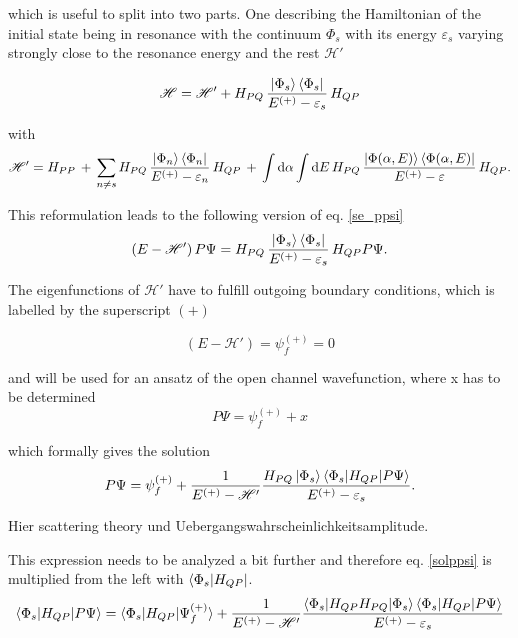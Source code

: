 which is useful to split into two parts. One describing the Hamiltonian of the
initial state being in resonance with the continuum $\Phi_s$ with its energy
$\varepsilon_s$ varying strongly close to the resonance energy and the rest
$\mathscr{H}'$

\begin{equation}
  \mathscr{H} = \mathscr{H}' + H_{PQ} \,\frac{\ket{\Phi_s}\bra{\Phi_s}}{E^{(+)}-\varepsilon_s}\, H_{QP}
\end{equation}

with
\begin{equation}
  \mathscr{H}' = H_{PP}\, + \,
  \sum\limits_{n\ne s} H_{PQ} \,\frac{\ket{\Phi_n}\bra{\Phi_n}}{E^{(+)}-\varepsilon_n}
  \, H_{QP} \,+\,
  \int \mathrm{d}\alpha \int\mathrm{d}E \,H_{PQ} \,
  \frac{\ket{\Phi(\alpha,E)}\bra{\Phi(\alpha,E)}}{E^{(+)}-\varepsilon} \, H_{QP} .
\end{equation}

This reformulation leads to the following version of eq. \ref{se_ppsi}
\begin{equation}
  (E - \mathscr{H}')\, P \Psi =
   H_{PQ} \,\frac{\ket{\Phi_s}\bra{\Phi_s}}{E^{(+)}-\varepsilon_s}\, H_{QP} P \Psi .
\end{equation}

The eigenfunctions of $\mathscr{H}'$ have to fulfill outgoing boundary conditions,
which is labelled by the superscript $(+)$

\begin{equation}
  (E-\mathscr{H}') = \psi_f^{(+)} = 0 \label{sol_outg}
\end{equation}

and will be used for an ansatz of the open channel wavefunction, where x has to
be determined
\begin{equation}
  P \Psi = \psi_f^{(+)} + x
\end{equation}

which formally gives the solution
\begin{equation}\label{sol_ppsi}
  P \Psi = \psi_f^{(+)} + \frac{1}{E^{(+)} - \mathscr{H}'}
           \frac{H_{PQ}\ket{\Phi_s}
           \braket{\Phi_s|H_{QP}|P\Psi}}{E^{(+)} - \varepsilon_s} .
\end{equation}

Hier scattering theory und Uebergangswahrscheinlichkeitsamplitude.

This expression needs to be analyzed a bit further and therefore eq. \ref{solppsi}
is multiplied from the left with $\bra{\Phi_s|H_{QP}}$.
\begin{equation}
  \braket{\Phi_s|H_{QP}|P\Psi} = \braket{\Phi_s|H_{QP}|\Psi_f^{(+)}} +
  \frac{1}{E^{(+)} - \mathscr{H}'}
  \frac{\braket{\Phi_s|H_{QP}H_{PQ}|\Phi_s} \braket{\Phi_s|H_{QP}|P\Psi}}
       {E^{(+)} - \varepsilon_s}  \label{s_ppsi}
\end {equation}

